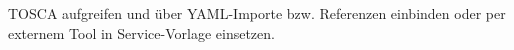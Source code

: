 %
%
%
%
%
%



%
%
%
%


TOSCA aufgreifen und über YAML-Importe bzw. Referenzen einbinden
oder per externem Tool in Service-Vorlage einsetzen.


%
%
%


